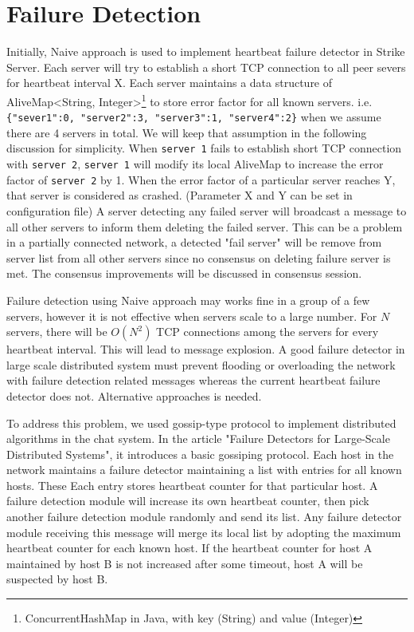 \documentclass[dareport.tex]{subfiles}
\begin{document}
\section{Failure Detection}

Initially, Naive approach is used to implement heartbeat failure detector in Strike Server. Each server will try to establish a short TCP connection to all peer severs for heartbeat interval X. Each server maintains a data structure of AliveMap<String, Integer>\footnote{ConcurrentHashMap in Java, with key (String) and value (Integer) } to store error factor for all known servers. i.e. \verb|{"sever1":0, "server2":3, "server3":1, "server4":2}| when we assume there are 4 servers in total. We will keep that assumption in the following discussion for simplicity. When \verb|server 1| fails to establish short TCP connection with \verb|server 2|, \verb|server 1| will modify its local AliveMap to increase the error factor of \verb|server 2| by 1. When the error factor of a particular server reaches Y, that server is considered as crashed. (Parameter X and Y can be set in configuration file) A server detecting any failed server will broadcast a message to all other servers to inform them deleting the failed server. This can be a problem in a partially connected network, a detected "fail server" will be remove from server list from all other servers since no consensus on deleting failure server is met. The consensus improvements will be discussed in consensus session.

Failure detection using Naive approach may works fine in a group of a few servers, however it is not effective when servers scale to a large number. For $N$ servers, there will be $O(N^{2})$ TCP connections among the servers for every heartbeat interval. This will lead to message explosion\cite{failuredetector}. A good failure detector in large scale distributed system must prevent flooding or overloading the network with failure detection related messages whereas the current heartbeat failure detector does not. Alternative approaches is needed.

To address this problem, we used gossip-type protocol to implement distributed algorithms in the chat system. In the article "Failure Detectors for Large-Scale Distributed Systems"\cite{failuredetector}, it introduces a basic gossiping protocol. Each host in the network maintains a failure detector maintaining a list with entries for all known hosts. These Each entry stores heartbeat counter for that particular host. A failure detection module will increase its own heartbeat counter, then pick another failure detection module randomly and send its list. Any failure detector module receiving this message will merge its local list by adopting the maximum heartbeat counter for each known host. If the heartbeat counter for host A  maintained by host B is not increased after some timeout, host A will be suspected by host B. 
\end{document}
